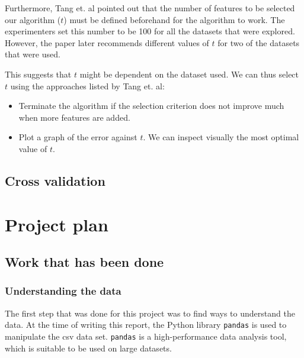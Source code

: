 \documentclass[12pt, twoside, a4paper]{article}
\begin{document}
Furthermore, Tang et. al pointed out that the number of features to be selected our algorithm ($t$) must be defined beforehand for the algorithm to work. The experimenters set this number to be 100 for all the datasets that were explored. However, the paper later recommends different values of $t$ for two of the datasets that were used.

This suggests that $t$ might be dependent on the dataset used. We can thus select $t$ using the approaches listed by Tang et. al:
\begin{itemize}
\item Terminate the algorithm if the selection criterion does not improve much when more features are added.
\item Plot a graph of the error against $t$. We can inspect visually the most optimal value of $t$.
\end{itemize}

\subsection{Cross validation}

\newpage

\section{Project plan}



\subsection{Work that has been done} \label{workDone}
\subsubsection{Understanding the data}
The first step that was done for this project was to find ways to understand the data. At the time of writing this report, the Python library \texttt{pandas} is used to manipulate the csv data set. \texttt{pandas} is a high-performance data analysis tool, which is suitable to be used on large datasets.
\end{document}
